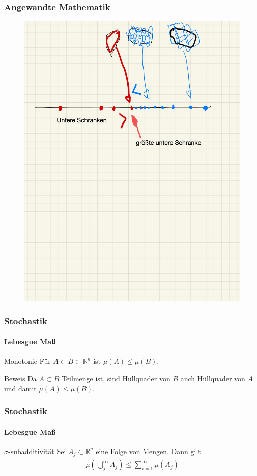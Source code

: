 \documentclass{beamer}
\begin{document}
\begin{frame}
    \frametitle{Angewandte Mathematik}

\begin{figure}[H]
      \centering
    \includegraphics[width=0.8 \textwidth]{img/untereschranke}
      \caption{}
\end{figure}
 \end{frame}



\begin{frame}
    \frametitle{Stochastik}
\framesubtitle{Lebesgue Maß}
    \begin{block}{Monotonie}
Für $A \subset B \subset \mathbb{R}^n$ ist $\mu(A) \leq \mu(B)$.
\end{block}

    \begin{block}{Beweis}
Da $A \subset B$ Teilmenge ist, sind Hüllquader von $B$  auch Hüllquader von $A$ und damit  $\mu(A) \leq \mu(B)$.
\end{block}
 \end{frame}


\begin{frame}
    \frametitle{Stochastik}
\framesubtitle{Lebesgue Maß}
    \begin{block}{$\sigma$-subadditivität}
Sei $A_j \subset \mathbb{R}^n$ eine Folge von Mengen. Dann gilt
\begin{align*}
\mu (\bigcup_j^{\infty} A_j ) \leq \sum_{i=1}^{\infty} \mu(A_j)
\end{align*}
\end{block}
 \end{frame}
\end{document}
